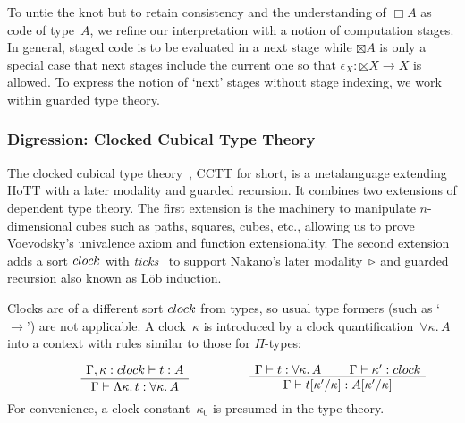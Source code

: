 \documentclass[a4paper,UKenglish,numberwithinsect,cleveref,thm-restate]{lipics-v2021}
\numberwithin{equation}{section}
\theoremstyle{definition}
\theoremstyle{plain}
\begin{document}
To untie the knot but to retain consistency and the understanding of $\Box A$ as code of type~$A$, we refine our interpretation with a notion of computation stages.
In general, staged code is to be evaluated in a next stage while   $\boxtimes A$ is only a special case that next stages include the current one so that $\epsilon_X\colon {\boxtimes} X \to X$ is allowed.
To express the notion of `next' stages without stage indexing, we work within guarded type theory.

\subsubsection{Digression: Clocked Cubical Type Theory}
The clocked cubical type theory~\cite{Kristensen2021}, CCTT for short, is a metalanguage extending HoTT with a later modality and guarded recursion.
It combines two extensions of dependent type theory.
The first extension is the machinery to manipulate $n$-dimensional cubes such as paths, squares, cubes, etc., allowing us to prove Voevodsky’s univalence axiom and function extensionality.
The second extension adds a sort $\clock$ with \emph{ticks}~\cite{Bahr2017} to support Nakano's later modality~$\mathord{\triangleright}$ and guarded recursion also known as Löb induction.

Clocks are of a different sort $\clock$ from types, so usual type formers (such as `$\to$') are not applicable.
A clock~$\kappa$ is introduced by a clock quantification~$\forall \kappa.\, A$ into a context with rules similar to those for $\Pi$-types:
\[
  \begin{minipage}{0.47\linewidth}
    \begin{prooftree}
      \AxiomC{$\Gamma, \kappa : \clock \vdash t : A$}
      \UnaryInfC{$\Gamma \vdash \Lambda \kappa.\, t : \forall \kappa.\, A $}
    \end{prooftree}
  \end{minipage}
  \begin{minipage}{0.47\linewidth}
    \begin{prooftree}
      \AxiomC{$\Gamma \vdash t : \forall \kappa.\, A$}
      \AxiomC{$\Gamma \vdash \kappa' : \clock $}
      \BinaryInfC{$\Gamma \vdash t[\kappa'/\kappa] : A[\kappa'/\kappa]$}
    \end{prooftree}
  \end{minipage}
\]
For convenience, a clock constant~$\kappa_0$ is presumed in the type theory.%
\end{document}

